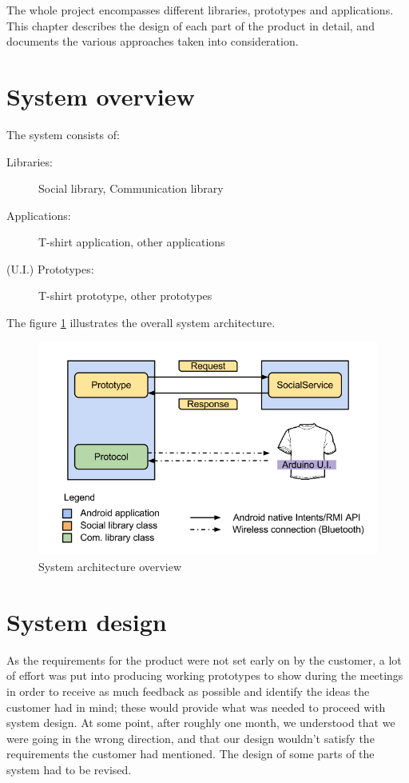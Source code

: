 The whole project encompasses different libraries, prototypes and applications.
This chapter describes the design of each part of the product in detail,
and documents the various approaches taken into consideration.

\section{System overview}

The system consists of:
\begin{description}
	\item[Libraries:] Social library, Communication library
	\item[Applications:] T-shirt application, other applications
	\item[(U.I.) Prototypes:] T-shirt prototype, other prototypes
\end{description}

The figure \ref{fig:design-toplevel} illustrates the overall system architecture.

\begin{figure}[h!]
	\centering \includegraphics[scale=0.55]{img/design-toplevel.png}
	\caption{System architecture overview}
	\label{fig:design-toplevel}
\end{figure}


\section{System design}
\label{sec:system-design}
As the requirements for the product were not set early on by the customer, a lot of effort
was put into producing working prototypes to show during the meetings in order to receive
as much feedback as possible and identify the ideas the customer had in mind; these would provide
what was needed to proceed with system design. At some point, after roughly one month,
we understood that we were going in the wrong direction, and that our design wouldn't satisfy
the requirements the customer had mentioned. The design of some parts of the system had to be revised.

